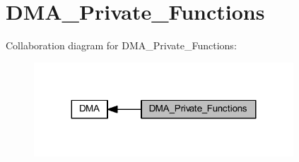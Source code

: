 \hypertarget{group___d_m_a___private___functions}{}\section{D\+M\+A\+\_\+\+Private\+\_\+\+Functions}
\label{group___d_m_a___private___functions}
Collaboration diagram for D\+M\+A\+\_\+\+Private\+\_\+\+Functions\+:
\nopagebreak
\begin{figure}[H]
\begin{center}
\leavevmode
\includegraphics[width=275pt]{group___d_m_a___private___functions}
\end{center}
\end{figure}
